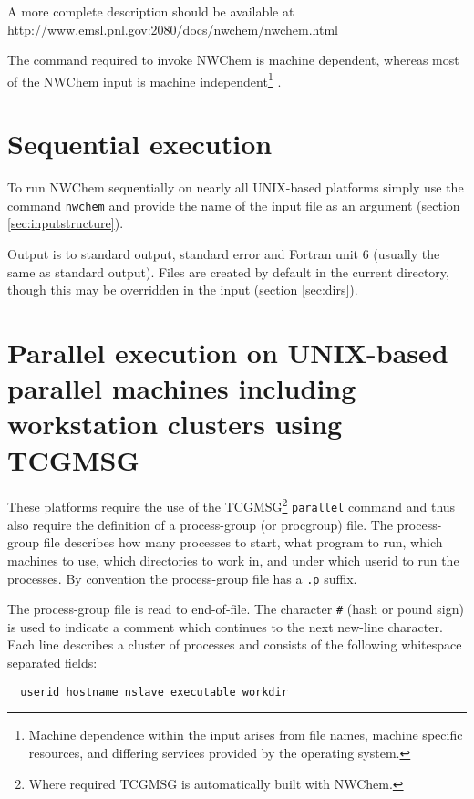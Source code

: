 A more complete description should be available at 
{http://www.emsl.pnl.gov:2080/docs/nwchem/nwchem.html}

The command required to invoke NWChem is machine dependent, whereas
most of the NWChem input is machine independent\footnote{Machine
dependence within the input arises from file names, machine
specific resources, and differing services provided by the operating system.} .

\section{Sequential execution}

To run NWChem sequentially on nearly all UNIX-based platforms simply
use the command \verb+nwchem+ and provide the name of the input file
as an argument (section \ref{sec:inputstructure}).

Output is to standard output, standard error and Fortran unit 6
(usually the same as standard output).  Files are created by default
in the current directory, though this may be overridden in the input
(section \ref{sec:dirs}).

\section{Parallel execution on UNIX-based parallel machines
including workstation clusters using TCGMSG}
\label{sec:procgrp}

 These platforms require the use of the TCGMSG\footnote{Where required
TCGMSG is automatically built with NWChem.} \verb+parallel+ command
and thus also require the definition of a process-group (or procgroup)
file.  The process-group file describes how many processes to start,
what program to run, which machines to use, which directories to work
in, and under which userid to run the processes.  By convention the
process-group file has a \verb+.p+ suffix.

The process-group file is read to end-of-file.  The character \verb+#+
(hash or pound sign) is used to indicate a comment which continues to
the next new-line character.  Each line describes a cluster of
processes and consists of the following whitespace separated fields:

\begin{verbatim}
  userid hostname nslave executable workdir
\end{verbatim}

